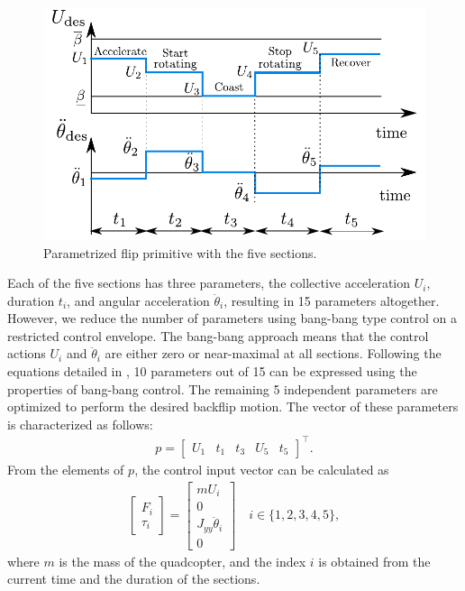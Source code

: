 \begin{figure}
\centering
\includegraphics[scale=.7]{Fig/sections2.pdf}
\caption{Parametrized flip primitive with the five sections.}\label{fig:sections}
\end{figure}

Each of the five sections has three parameters, the collective acceleration $U_i$, duration $t_i$, and angular acceleration $\ddot{\theta}_i$, resulting in 15 parameters altogether. However, we reduce the number of parameters using bang-bang type control on a restricted control envelope. The bang-bang approach means that the control actions $U_i$ and $\ddot\theta_i$ are either zero or near-maximal at all sections. Following the equations detailed in \cite{LSICRA2010}, 10 parameters out of 15 can be expressed using the properties of bang-bang control. The remaining 5 independent parameters are optimized to perform the desired backflip motion. The vector of these parameters is characterized as follows:
\begin{align}
p=\begin{bmatrix}\label{eq:openparams}
U_1 & t_1 & t_3 & U_5& t_5
\end{bmatrix} ^\top.
\end{align} 
From the elements of $p$, the control input vector can be calculated as
 \begin{align}\label{eq:openinp}
    \begin{bmatrix}
        F_i \\ \tau_i
    \end{bmatrix}=\begin{bmatrix}
        mU_i \\ 0 \\ J_{yy}\ddot{\theta}_i \\ 0
    \end{bmatrix}\quad i\in\{1,2,3,4,5\},
\end{align}   
where $m$ is the mass of the quadcopter, and the index $i$ is obtained from the current time and the duration of the sections.

